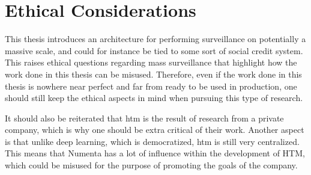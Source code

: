 \section{Ethical Considerations}
This thesis introduces an architecture for performing surveillance on potentially a massive scale, and could for instance be tied to some sort of social credit system. This raises ethical questions regarding mass surveillance that highlight how the work done in this thesis can be misused. Therefore, even if the work done in this thesis is nowhere near perfect and far from ready to be used in production, one should still keep the ethical aspects in mind when pursuing this type of research.
\par
It should also be reiterated that \gls*{htm} is the result of research from a private company, which is why one should be extra critical of their work. Another aspect is that unlike deep learning, which is democratized, \gls*{htm} is still very centralized. This means that Numenta has a lot of influence within the development of HTM, which could be misused for the purpose of promoting the goals of the company.
